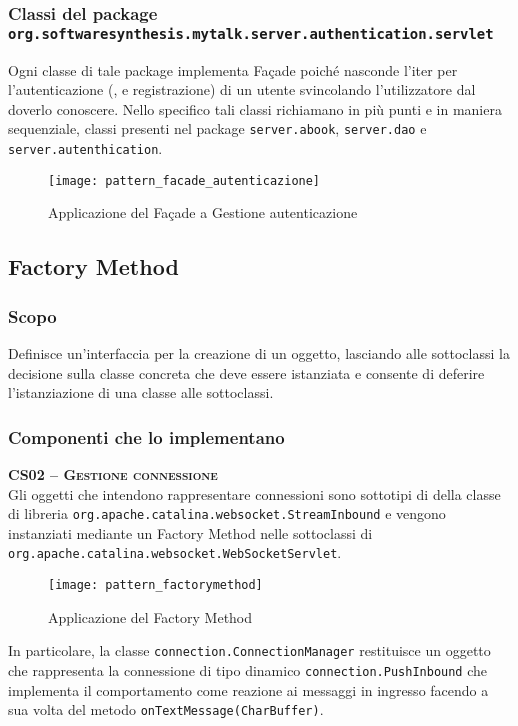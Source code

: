 \subsubsection*{Classi del package \texttt{org.softwaresynthesis.mytalk.server.authentication.servlet}}

Ogni classe di tale package implementa Façade poiché nasconde l'iter per l'autenticazione (,   e registrazione) di un utente svincolando l'utilizzatore dal doverlo conoscere. Nello specifico tali classi richiamano in più punti e in maniera sequenziale, classi presenti nel package \texttt{server.abook}, \texttt{server.dao} e \texttt{server.autenthication}.

\begin{figure}[H]
  \centering
  \texttt{[image: pattern\_facade\_autenticazione]}
  \caption{Applicazione del  Façade a \textsf{Gestione autenticazione}}\label{fig:facademessage}
\end{figure}


\subsection{Factory Method}\label{sec:patternfactorymethod}

\subsubsection{Scopo}
Definisce un'interfaccia per la creazione di un oggetto, lasciando alle sottoclassi la decisione sulla classe concreta che deve essere istanziata e consente di deferire l'istanziazione di una classe alle sottoclassi.

\subsubsection{Componenti che lo implementano}
\begin{description}

  \item{\scshape\bfseries CS02 -- Gestione connessione}\\
Gli oggetti che intendono rappresentare connessioni sono sottotipi di della classe di libreria \texttt{org.apache.catalina.websocket.StreamInbound} e vengono instanziati mediante un Factory Method nelle sottoclassi di \texttt{org.apache.catalina.websocket.WebSocketServlet}.

\begin{figure}[H]
  \centering
  \texttt{[image: pattern\_factorymethod]}
  \caption{Applicazione del  Factory Method}\label{fig:factory_method}
\end{figure}

In particolare, la classe \texttt{connection.ConnectionManager} restituisce un oggetto che rappresenta la connessione di tipo dinamico \texttt{connection.PushInbound} che implementa il comportamento come reazione ai messaggi in ingresso facendo a sua volta  del metodo \texttt{onTextMessage(CharBuffer)}.
\end{description}

